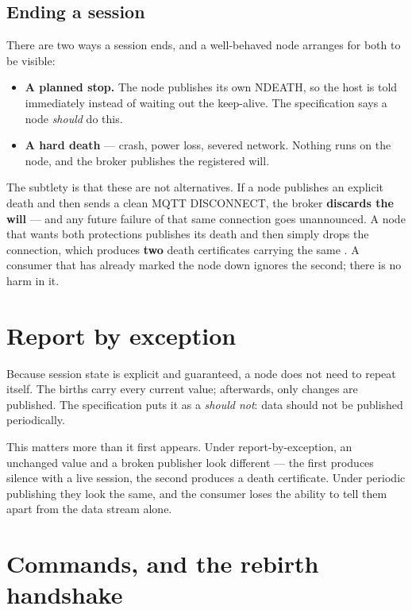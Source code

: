 \subsection{Ending a session}

There are two ways a session ends, and a well-behaved node arranges for both to be
visible:

\begin{itemize}
  \item \textbf{A planned stop.} The node publishes its own NDEATH, so the host is told
        immediately instead of waiting out the keep-alive. The specification says a node
        \emph{should} do this.
  \item \textbf{A hard death} --- crash, power loss, severed network. Nothing runs on the
        node, and the broker publishes the registered will.
\end{itemize}

The subtlety is that these are not alternatives. If a node publishes an explicit death and
then sends a clean MQTT DISCONNECT, the broker \textbf{discards the will} --- and any
future failure of that same connection goes unannounced. A node that wants both
protections publishes its death and then simply drops the connection, which produces
\textbf{two} death certificates carrying the same . A consumer that has already
marked the node down ignores the second; there is no harm in it.

\section{Report by exception}

Because session state is explicit and guaranteed, a node does not need to repeat itself.
The births carry every current value; afterwards, only changes are published. The
specification puts it as a \emph{should not}: data should not be published periodically.

This matters more than it first appears. Under report-by-exception, an unchanged value and
a broken publisher look different --- the first produces silence with a live session, the
second produces a death certificate. Under periodic publishing they look the same, and the
consumer loses the ability to tell them apart from the data stream alone.

\section{Commands, and the rebirth handshake}
\label{sec:sp-rebirth}

